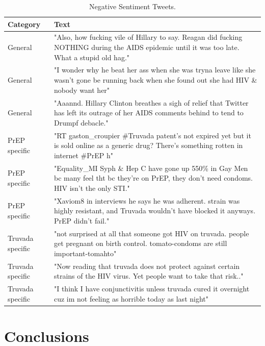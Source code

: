 \documentclass{sig-alternate-05-2015}
\begin{document}
\begin{table}
\centering
\caption{Negative Sentiment Tweets.}
\begin{tabular}{|p{2cm}|p{12cm}|} \hline
Category & Text\\ \hline
General & "Also, how fucking vile of Hillary to say. Reagan did fucking NOTHING during the AIDS epidemic until it was too late. What a stupid old hag."\\ \hline
General & "I wonder why he beat her ass when she was tryna leave like she wasn't gone be running back when she found out she had HIV \& nobody want her"\\ \hline
General & "Aaannd. Hillary Clinton breathes a sigh of relief that Twitter has left its outrage of her AIDS comments behind to tend to Drumpf debacle."\\ \hline

PrEP specific & "RT gaston\_croupier \#Truvada patent's not expired yet but it is sold online as a generic drug? There's something rotten in internet \#PrEP h"\\ \hline
PrEP specific & "Equality\_MI Syph \& Hep C have gone up 550\% in Gay Men bc many feel tht bc they're on PrEP, they don't need condoms. HIV isn't the only STI."\\ \hline
PrEP specific & "Xaviom8 in interviews he says he was adherent. strain was highly resistant, and Truvada wouldn't have blocked it anyways. PrEP didn't fail."\\ \hline

Truvada specific & "not surprised at all that someone got HIV on truvada. people get pregnant on birth control. tomato-condoms are still important-tomahto"\\ \hline
Truvada specific & "Now reading that truvada does not protect against certain strains of the HIV virus. Yet people want to take that risk.."\\ \hline
Truvada specific & "I think I have conjunctivitis unless truvada cured it overnight cuz im not feeling as horrible today as last night"\\ \hline

\hline\end{tabular}
\end{table}


\section{Conclusions}
\end{document}
